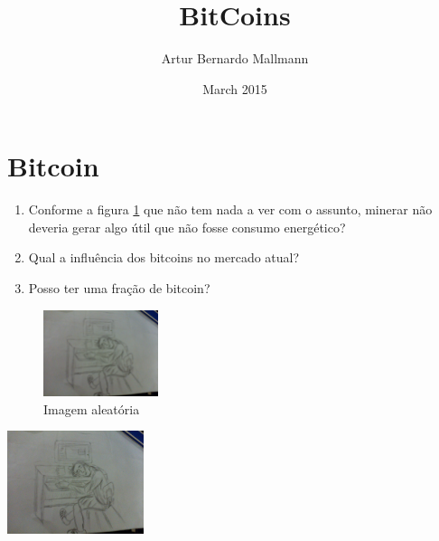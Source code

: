 \documentclass{article}
\title{BitCoins}
\author{Artur Bernardo Mallmann }
\date{March 2015}
\begin{document}
\maketitle

\section{Bitcoin}

\begin{enumerate}
\item Conforme a figura \ref{fig:my_label} que não tem nada a ver com o assunto, minerar não deveria gerar algo útil que não fosse consumo energético?
\item Qual a influência dos bitcoins no mercado atual?
\item Posso ter uma fração de bitcoin?
\end{enumerate}

\begin{figure}[h]
\centering
\includegraphics[width=0.3\textwidth]{desenho.jpg}
\caption{Imagem aleatória}
\label{fig:my_label}
\end{figure}

\includegraphics[width=0.3\textwidth]{desenho.jpg}
\end{document}
